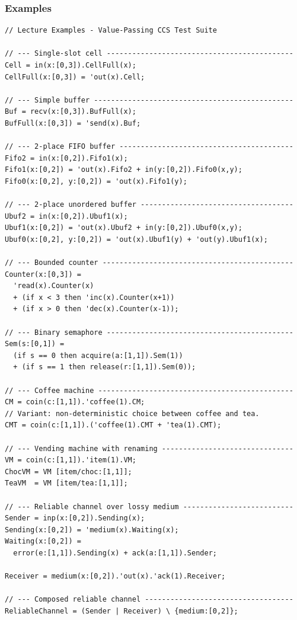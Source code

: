 \documentclass[t]{beamer}
\begin{document}
\begin{frame}[fragile]
  \frametitle{Examples}

  \begin{lstlisting}[language={}, basicstyle=\ttfamily\tiny]
// Lecture Examples - Value-Passing CCS Test Suite

// --- Single-slot cell --------------------------------------------
Cell = in(x:[0,3]).CellFull(x);
CellFull(x:[0,3]) = 'out(x).Cell;

// --- Simple buffer -----------------------------------------------
Buf = recv(x:[0,3]).BufFull(x);
BufFull(x:[0,3]) = 'send(x).Buf;

// --- 2-place FIFO buffer -----------------------------------------
Fifo2 = in(x:[0,2]).Fifo1(x);
Fifo1(x:[0,2]) = 'out(x).Fifo2 + in(y:[0,2]).Fifo0(x,y);
Fifo0(x:[0,2], y:[0,2]) = 'out(x).Fifo1(y);

// --- 2-place unordered buffer ------------------------------------
Ubuf2 = in(x:[0,2]).Ubuf1(x);
Ubuf1(x:[0,2]) = 'out(x).Ubuf2 + in(y:[0,2]).Ubuf0(x,y);
Ubuf0(x:[0,2], y:[0,2]) = 'out(x).Ubuf1(y) + 'out(y).Ubuf1(x);

// --- Bounded counter ---------------------------------------------
Counter(x:[0,3]) =
  'read(x).Counter(x)
  + (if x < 3 then 'inc(x).Counter(x+1))
  + (if x > 0 then 'dec(x).Counter(x-1));

// --- Binary semaphore --------------------------------------------
Sem(s:[0,1]) =
  (if s == 0 then acquire(a:[1,1]).Sem(1))
  + (if s == 1 then release(r:[1,1]).Sem(0));

// --- Coffee machine ----------------------------------------------
CM = coin(c:[1,1]).'coffee(1).CM;
// Variant: non-deterministic choice between coffee and tea.
CMT = coin(c:[1,1]).('coffee(1).CMT + 'tea(1).CMT);

// --- Vending machine with renaming -------------------------------
VM = coin(c:[1,1]).'item(1).VM;
ChocVM = VM [item/choc:[1,1]];
TeaVM  = VM [item/tea:[1,1]];

// --- Reliable channel over lossy medium --------------------------
Sender = inp(x:[0,2]).Sending(x);
Sending(x:[0,2]) = 'medium(x).Waiting(x);
Waiting(x:[0,2]) =
  error(e:[1,1]).Sending(x) + ack(a:[1,1]).Sender;

Receiver = medium(x:[0,2]).'out(x).'ack(1).Receiver;

// --- Composed reliable channel -----------------------------------
ReliableChannel = (Sender | Receiver) \ {medium:[0,2]};

  \end{lstlisting}

\end{frame}
\end{document}
